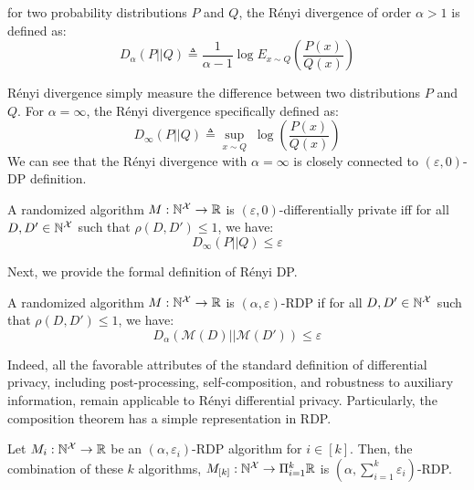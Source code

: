 \begin{definition}
  for two probability distributions $P$ and $Q$, the R\'enyi divergence of order $\alpha > 1$ is defined as:
  \begin{equation*}
    D_{\alpha}(P||Q) \triangleq \frac{1}{\alpha-1} \log E_{x \sim Q}\left ( \frac{P(x)}{Q(x)} \right )
  \end{equation*}
\end{definition}
R\'enyi divergence simply measure the difference between two distributions $P$ and $Q$.
For $\alpha = \infty$, the R\'enyi divergence specifically defined as:
\begin{equation*}
  D_{\infty}(P||Q) \triangleq  \sup_{x \sim Q} \; \log \left ( \frac{P(x)}{Q(x)} \right ) 
\end{equation*}
We can see that the R\'enyi divergence with $\alpha=\infty$ is closely connected to $(\varepsilon, 0)$-DP definition.
\begin{proposition}
  A randomized algorithm $M: \mathbb{N}^\mathcal{X} \rightarrow \mathbb{R}$ is $(\varepsilon, 0)$-differentially private iff for all $D, D' \in \mathbb{N}^\mathcal{X}$ such that $\rho(D, D') \leq 1$, we have:
  \begin{equation*}
    D_{\infty}(P||Q) \leq \varepsilon
  \end{equation*} 
\end{proposition}
\noindent Next, we provide the formal definition of R\'enyi DP.
\begin{definition}
  A randomized algorithm $M: \mathbb{N}^\mathcal{X} \rightarrow \mathbb{R}$ is $(\alpha, \varepsilon)$-RDP if for all $D, D' \in \mathbb{N}^\mathcal{X}$ such that $\rho(D, D') \leq 1$, we have:
  \begin{equation*}
    D_{\alpha}(\mathcal{M}(D)||\mathcal{M}(D')) \leq \varepsilon
  \end{equation*}
\end{definition}
\noindent Indeed, all the favorable attributes of the standard definition of differential privacy, including post-processing, self-composition, and robustness to auxiliary information, remain applicable to R\'enyi differential  privacy.
Particularly, the composition theorem has a simple representation in RDP.
\begin{proposition}\label{prop:rdp-composition}
  Let $M_i: \mathbb{N}^\mathcal{X} \rightarrow \mathbb{R}$ be an $(\alpha, \varepsilon_i)$-RDP algorithm for $i \in [k]$. Then, the combination of these $k$ algorithms, $M_{[k]}: \mathbb{N}^\mathcal{X} \rightarrow \Pi_{i=1}^{k}\mathbb{R}$ is $(\alpha, \sum_{i=1}^{k}\varepsilon_i)$-RDP.   
\end{proposition}
